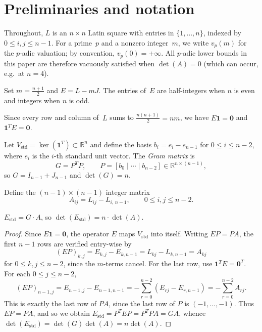 \documentclass[11pt,a4paper]{article}
\newcommand{\one}{\mathbf{1}}
\newcommand{\Estd}{E_{\mathrm{std}}}
\newcommand{\Vstd}{V_{\mathrm{std}}}
\begin{document}
\section{Preliminaries and notation}\label{sec:prelim}

Throughout, $L$ is an $n\times n$ Latin square with entries in
$\{1,\dots,n\}$, indexed by $0\le i,j\le n-1$.
For a prime~$p$ and a nonzero integer~$m$, we write $v_p(m)$ for the
$p$-adic valuation; by convention, $v_p(0)=+\infty$.
All $p$-adic lower bounds in this paper are therefore vacuously
satisfied when $\det(A)=0$ (which can occur, e.g.\ at $n=4$).

\begin{definition}
Set $m=\frac{n+1}{2}$ and $E=L-mJ$.  The entries of~$E$ are half-integers
when $n$ is even and integers when $n$ is odd.
\end{definition}

Since every row and column of~$L$ sums to $\frac{n(n+1)}{2}=nm$, we have
$E\one=\mathbf{0}$ and $\one^T E=\mathbf{0}$.

\begin{definition}
Let $\Vstd=\ker(\one^T)\subset\mathbb{R}^n$ and define
the basis $b_i=e_i-e_{n-1}$ for $0\le i\le n-2$, where $e_i$ is the
$i$-th standard unit vector.  The \emph{Gram matrix} is
\[
  G = P^T P, \qquad P = [b_0\mid\cdots\mid b_{n-2}] \in \mathbb{R}^{n\times(n-1)},
\]
so $G=I_{n-1}+J_{n-1}$ and $\det(G)=n$.
\end{definition}

\begin{definition}
Define the $(n{-}1)\times(n{-}1)$ integer matrix
\[
  A_{ij} = L_{ij} - L_{i,\,n-1}, \qquad 0\le i,j\le n-2.
\]
\end{definition}

\begin{lemma}\label{lem:gram}
$\Estd = G\cdot A$, so $\det(\Estd)=n\cdot\det(A)$.
\end{lemma}

\begin{proof}
Since $E\one=\mathbf{0}$, the operator $E$ maps $\Vstd$
into itself.  Writing $EP=PA$, the first $n-1$ rows are verified
entry-wise by
\[
  (EP)_{k,j}=E_{k,j}-E_{k,n-1}=L_{kj}-L_{k,n-1}=A_{kj}
\]
for $0\le k,j\le n-2$, since the $m$-terms cancel.  For the last row,
use $\one^TE=\mathbf{0}^T$.  For each $0\le j\le n-2$,
\[
  (EP)_{n-1,j}=E_{n-1,j}-E_{n-1,n-1}
  =-\sum_{r=0}^{n-2}(E_{rj}-E_{r,n-1})
  =-\sum_{r=0}^{n-2}A_{rj}.
\]
This is exactly the last row of $PA$, since the last row of $P$ is
$(-1,\dots,-1)$.  Thus $EP=PA$, and so we obtain
$\Estd = P^TEP = P^TPA = GA$, whence
$\det(\Estd)=\det(G)\det(A)=n\det(A)$.
\end{proof}
\end{document}
